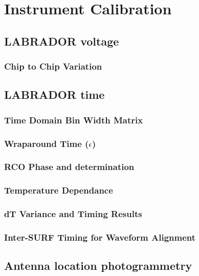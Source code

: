 \documentclass[11pt]{uhthesis}
\begin{document}
\chapter{Instrument Calibration}

\section{LABRADOR voltage}

	\subsection{Chip to Chip Variation}
	
	
\section{LABRADOR time}
	\subsection{Time Domain Bin Width Matrix}

	\subsection{Wraparound Time ($\epsilon$)}
	
	\subsection{RCO Phase and determination}
	
	\subsection{Temperature Dependance}
	
	\subsection{dT Variance and Timing Results}
	
	\subsection{Inter-SURF Timing for Waveform Alignment}
	
\section{Antenna location photogrammetry}
\end{document}
